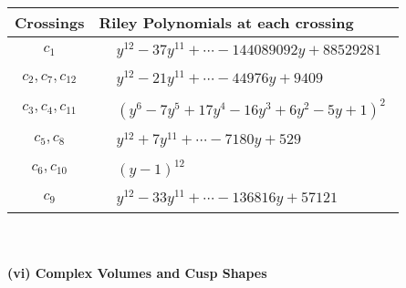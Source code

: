 \documentclass[1p]{elsarticle_modified}
\theoremstyle{definition}
\begin{document}
\begin{tabular}{m{50pt}|m{274pt}}
Crossings & \hspace{64pt}Riley Polynomials at each crossing \\
\hline $$\begin{aligned}c_{1}\end{aligned}$$&$\begin{aligned}
&y^{12}-37 y^{11}+\cdots-144089092 y+88529281
\end{aligned}$\\
\hline $$\begin{aligned}c_{2},c_{7},c_{12}\end{aligned}$$&$\begin{aligned}
&y^{12}-21 y^{11}+\cdots-44976 y+9409
\end{aligned}$\\
\hline $$\begin{aligned}c_{3},c_{4},c_{11}\end{aligned}$$&$\begin{aligned}
&(y^6-7 y^5+17 y^4-16 y^3+6 y^2-5 y+1)^2
\end{aligned}$\\
\hline $$\begin{aligned}c_{5},c_{8}\end{aligned}$$&$\begin{aligned}
&y^{12}+7 y^{11}+\cdots-7180 y+529
\end{aligned}$\\
\hline $$\begin{aligned}c_{6},c_{10}\end{aligned}$$&$\begin{aligned}
&(y-1)^{12}
\end{aligned}$\\
\hline $$\begin{aligned}c_{9}\end{aligned}$$&$\begin{aligned}
&y^{12}-33 y^{11}+\cdots-136816 y+57121
\end{aligned}$\\
\hline
\end{tabular}\\~\\
\newpage\flushleft \textbf{(vi) Complex Volumes and Cusp Shapes}
\end{document}
